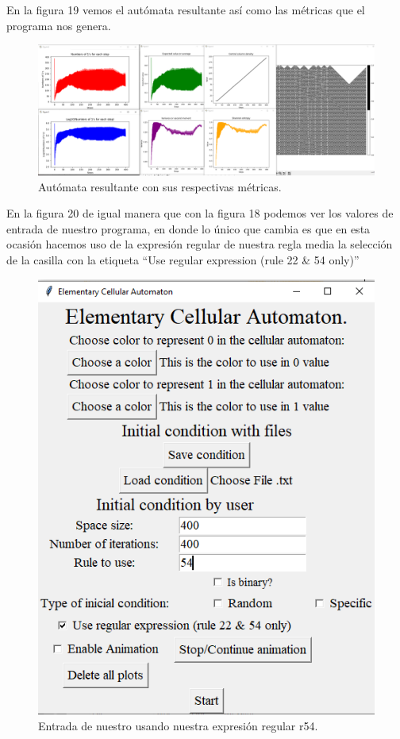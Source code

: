 \documentclass[11pt]{article}
\begin{document}
		En la figura 19 vemos el autómata resultante así como las métricas que el programa nos genera.
		\begin{figure}[H]
			\includegraphics[scale=0.26]{resources/RegEx54/95_prob_result.png}
			\caption{Autómata resultante con sus respectivas métricas.}\label{fig:picture}
		\end{figure}		
		En la figura 20 de igual manera que con la figura 18 podemos ver los valores de entrada de nuestro programa, en donde lo único que cambia es que en esta ocasión hacemos uso de la expresión regular de nuestra regla media la selección de la casilla con la etiqueta ``Use regular expression (rule 22 \& 54 only)''
		\begin{figure}[H]
			\centering
			\includegraphics[scale=0.5]{resources/RegEx54/50_prob_regex_entrada.png}
			\caption{Entrada de nuestro usando nuestra expresión regular r54.}\label{fig:picture}
		\end{figure}
\end{document}

